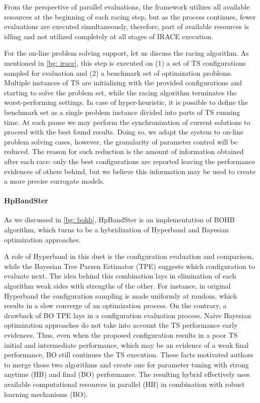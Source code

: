 From the perspective of parallel evaluations, the framework utilizes all available resources at the beginning of each racing step, but as the process continues, fewer evaluations are executed simultaneously, therefore, part of available resources is idling and not utilized completely at all stages of IRACE execution.

For the on-line problem solving support, let us discuss the racing algorithm. As mentioned in \cref{bg: irace}, this step is executed on (1) a set of TS configurations sampled for evaluation and (2) a benchmark set of optimization problems. Multiple instances of TS are initializing with the provided configurations and starting to solve the problem set, while the racing algorithm terminates the worst-performing settings. In case of hyper-heuristic, it is possible to define the benchmark set as a single problem instance divided into parts of TS running time. At each pause we may perform the synchronization of current solutions to proceed with the best found results. Doing so, we adapt the system to on-line problem solving cases, however, the granularity of parameter control will be reduced. The reason for such reduction is the amount of information obtained after each race: only the best configurations are reported leaving the performance evidences of others behind, but we believe this information may be used to create a more precise surrogate models.

\paragraph{HpBandSter} As we discussed in \cref{bg: bohb}, HpBandSter is an implementation of BOHB algorithm, which turns to be a hybridization of Hyperband and Bayesian optimization approaches.

A role of Hyperband in this duet is the configuration evaluation and comparison, while the Bayesian Tree Parzen Estimator (TPE) suggests which configuration to evaluate next. The idea behind this combination lays in elimination of each algorithm weak sides with strengths of the other. For instance, in original Hyperband the configuration sampling is made uniformly at random, which results in a slow converge of an optimization process. On the contrary, a drawback of BO TPE lays in a configuration evaluation process. Naive Bayesian optimization approaches do not take into account the TS performance early evidences. Thus, even when the proposed configuration results in a poor TS initial and intermediate performance, which may be an evidence of a weak final performance, BO still continues the TS execution. These facts motivated authors to merge those two algorithms and create one for parameter tuning with strong anytime (HB) and final (BO) performance. The resulting hybrid effectively uses available computational resources in parallel (HB) in combination with robust learning mechanisms (BO).

